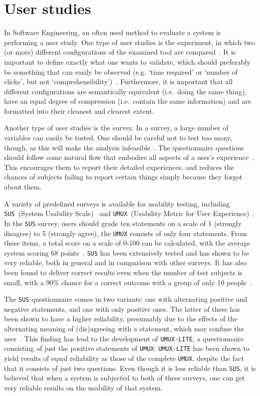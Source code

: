 \section{User studies}
In Software Engineering, an often used method to evaluate a system is performing a user study. One type of user studies is the experiment, in which two (or more) different configurations of the examined tool are compared~\cite{wohlin2003empirical}. It is important to define exactly what one wants to validate, which should preferably be something that can easily be observed (e.g. `time required' or `number of clicks', but not `comprehensibility')~\cite{stein2009assessing}. Furthermore, it is important that all different configurations are semantically equivalent (i.e.\ doing the same thing), have an equal degree of compression (i.e.\ contain the same information) and are formatted into their cleanest and clearest extent.

Another type of user studies is the survey. In a survey, a large number of variables can easily be tested. One should be careful not to test too many, though, as this will make the analysis infeasible~\cite{wohlin2003empirical}. The questionnaire questions should follow some natural flow that embodies all aspects of a user's experience~\cite{tuch2013analyzing}. This encourages them to report their detailed experiences, and reduces the chances of subjects failing to report certain things simply because they forgot about them.

A variety of predefined surveys is available for usability testing, including \verb|SUS|~(System Usability Scale)~\cite{brooke2013sus} and \verb|UMUX|~(Usability Metric for User Experience)~\cite{lewis2013umux}. In the \verb|SUS| survey, users should grade ten statements on a scale of 1 (strongly disagree) to 5 (strongly agree), the \verb|UMUX| consists of only four statements. From these items, a total score on a scale of 0-100 can be calculated, with the average system scoring 68 points~\cite{sauro2011measuring}. \verb|SUS| has been extensively tested and has shown to be very reliable, both in general and in comparison with other surveys. It has also been found to deliver correct results even when the number of test subjects is small, with a $90\%$ chance for a correct outcome with a group of only 10 people~\cite{tullis2004comparison}.

The \verb|SUS| questionnaire comes in two variants: one with alternating positive and negative statements, and one with only positive ones. The latter of these has been shown to have a higher reliability, presumably due to the effects of the alternating meaning of (dis)agreeing with a statement, which may confuse the user~\cite{lewis2013umux}. This finding has lead to the development of \verb|UMUX-LITE|, a questionnaire consisting of just the positive statements of \verb|UMUX|. \verb|UMUX-LITE| has been shown to yield results of equal reliability as those of the complete \verb|UMUX|, despite the fact that it consists of just two questions. Even though it is less reliable than \verb|SUS|, it is believed that when a system is subjected to both of these surveys, one can get very reliable results on the usability of that system.

